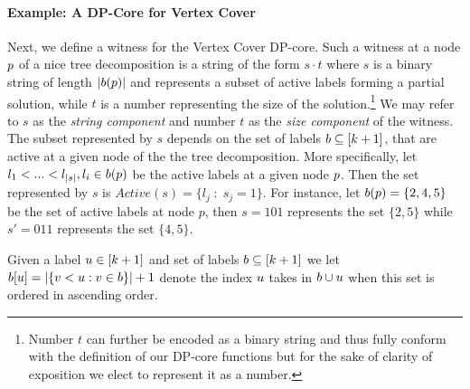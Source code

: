 \paragraph*{Example: A DP-Core for Vertex Cover}
\label{subsection:VC}
Next, we define a witness for the {\sc Vertex Cover} DP-core. Such a witness at a node $p$ of a nice tree decomposition is a string of the form $ s\cdot t$ where $s$ is a binary string of length $|b(p)|$ and represents a subset of active labels forming a partial solution, while $t$ is a number representing the size of the solution.\footnote{Number $t$ can further be encoded as a binary string and thus fully conform with the definition of our DP-core functions but for the sake of clarity of exposition we elect to represent it as a number.} We may refer to $s$ as the \textit{string component} and number $t$ as the \textit{size component} of the witness. The subset represented by $s$ depends on the set of labels $b \subseteq [k+1]$, that are active at a given node of the the tree decomposition. More specifically, let $l_1 < ... < l_{|s|}, l_i \in b(p)$ be the active labels at a given node $p$. Then the set represented by $s$ is $Active(s) = \{l_j \;:\; s_j=1\}$. For instance, let
$b(p) = \{2,4,5\}$ be the set of active labels at node $p$, then $s=101$ represents the set $\{2,5\}$ while $s'=011$ represents the set $\{4,5\}$.  

Given a label $u \in [k+1]$ and set of labels $b \subseteq [k+1]$ we let $b[u] = |\{v < u : v \in b \}|+1$ denote the index $u$ takes in $b \cup u$ when this set is ordered in ascending order. 

